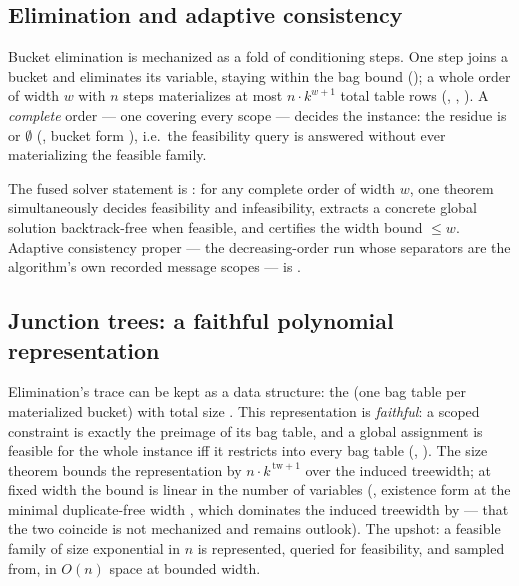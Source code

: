\documentclass[11pt]{article}
\begin{document}
\subsection{Elimination and adaptive consistency}

Bucket elimination \citep{dechter1999bucket,dechter2003constraint} is
mechanized as a fold of conditioning steps.  One step joins a bucket and
eliminates its variable, staying within the bag bound
(); a whole order of width $w$ with $n$ steps
materializes at most $n\cdot k^{w+1}$ total table rows
(,
,
).  A \emph{complete} order --- one
covering every scope --- decides the instance: the residue is
 or $\emptyset$ (,
bucket form ), i.e.\ the feasibility query
is answered without ever materializing the feasible family.

The fused solver statement is
: for any complete order of
width $w$, one theorem simultaneously decides feasibility and
infeasibility, extracts a concrete global solution backtrack-free when
feasible, and certifies the width bound
 $\le w$.  Adaptive consistency proper --- the
decreasing-order run whose separators are the algorithm's own recorded
message scopes --- is .

\subsection{Junction trees: a faithful polynomial representation}

Elimination's trace can be kept as a data structure: the
 (one bag table per materialized bucket) with total
size .  This representation is \emph{faithful}: a
scoped constraint is exactly the preimage of its bag table, and a global
assignment is feasible for the whole instance iff it restricts into
every bag table (,
).  The size theorem
 bounds the representation by
$n\cdot k^{\,\mathrm{tw}+1}$ over the induced treewidth; at fixed width
the bound is linear in the number of variables
(, existence form
 at the minimal duplicate-free width
, which dominates the induced treewidth by
 --- that the two coincide is
not mechanized and remains outlook).  The upshot: a feasible family of
size exponential in $n$ is represented, queried for feasibility, and
sampled from, in $O(n)$ space at bounded width.
\end{document}
